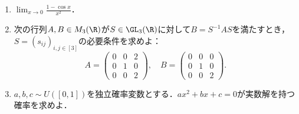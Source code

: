 \documentclass[uplatex,dvipdfmx]{jsarticle}
\begin{document}
\begin{tcolorbox}[colframe=ForestGreen, colback=ForestGreen!10!white,breakable,colbacktitle=ForestGreen!40!white,coltitle=black,fonttitle=\bfseries\sffamily,
    title=第１問]
    \begin{problem}\mbox{}
        \begin{enumerate}
            \item $\lim_{x\to 0}\frac{1-\cos x}{x^2}$．
            \item 次の行列$A,B\in M_3(\R)$が$S\in\GL_3(\R)$に対して$B=S^{-1}AS$を満たすとき，$S=(s_{ij})_{i,j\in[3]}$の必要条件を求めよ：
            \[A=\begin{pmatrix}
                0&0&2\\0&1&0\\0&0&2
            \end{pmatrix},\quad B=\begin{pmatrix}0&0&0\\0&1&0\\0&0&2\end{pmatrix}.\]
            \item $a,b,c\sim U([0,1])$を独立確率変数とする．$ax^2+bx+c=0$が実数解を持つ確率を求めよ．
        \end{enumerate}
    \end{problem}
\end{tcolorbox}
\end{document}
